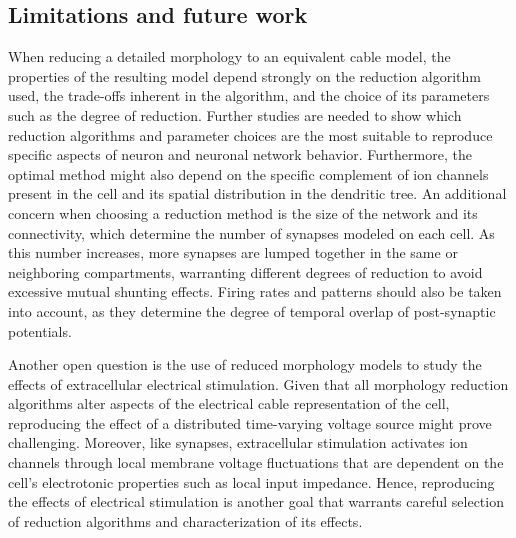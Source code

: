 %
%
%

%
\subsection{Limitations and future work}
%
%
%
%
%

%
%
%
%
%
%
%

%
When reducing a detailed morphology to an equivalent cable model, the properties of
the resulting model depend strongly on the reduction algorithm used, the trade-offs
inherent in the algorithm, and the choice of its parameters such as the degree of reduction.
Further studies are needed to show which reduction algorithms and parameter choices
are the most suitable to reproduce specific aspects of neuron and neuronal network behavior.
Furthermore, the optimal method might also depend on the specific complement of ion channels present in
the cell and its spatial distribution in the dendritic tree. An additional concern
when choosing a reduction method is the size of the network and its connectivity,
which determine the number of synapses modeled on each cell. As this number increases,
more synapses are lumped together in the same or neighboring compartments, warranting
different degrees of reduction to avoid excessive mutual shunting effects. Firing rates
and patterns should also be taken into account, as they determine the degree of temporal
overlap of post-synaptic potentials.

%
Another open question is the use of reduced morphology models to study the effects
of extracellular electrical stimulation. Given that all morphology reduction algorithms
alter aspects of the electrical cable representation of the cell, reproducing the effect
of a distributed time-varying voltage source might prove challenging.
Moreover, like synapses, extracellular stimulation
activates ion channels through local membrane voltage fluctuations \cite{johnson_quantifying_2008}
that are dependent on the cell's electrotonic properties such as local input impedance.
Hence, reproducing the effects of electrical stimulation is another goal that warrants
careful selection of reduction algorithms and characterization of its effects.


